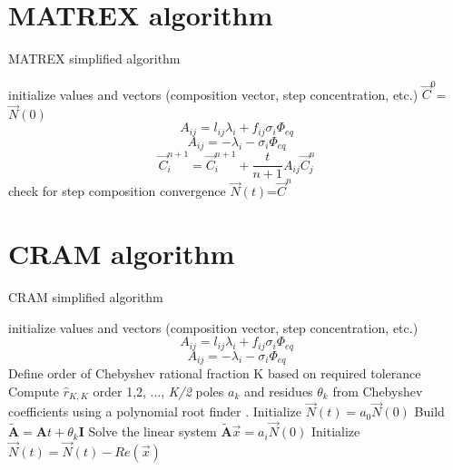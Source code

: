 \documentclass[a4paper,titlepage]{article}
\newcommand{\xvec}{\ensuremath{\vec{x}}}
\newcommand{\nvec}{\ensuremath{\vec{N}}}
\newcommand{\cvec}{\ensuremath{\vec{C}}}
\begin{document}
\newpage
\begin{appendices}
\section{MATREX algorithm}
\label{App:Matrex}
\begin{algorithm}
\caption{MATREX simplified algorithm}
\begin{algorithmic}
\STATE initialize values and vectors (composition vector, step concentration, etc.)
\STATE $\cvec^0$=$\nvec(0)$
\STATE\[A_{ij}=l_{ij}\lambda_i+f_{ij}\sigma_i\Phi_{eq}\]
\ELSE 
\STATE \[A_{ij}=-\lambda_i -\sigma_i\Phi_{eq}\]
\ENDIF
\ENDFOR
\ENDFOR
{}
\STATE\[\cvec^{n+1}_i=\cvec^{n+1}_i+\frac{t}{n+1}A_{ij}\cvec_j^n\]
\ENDFOR
\ENDFOR
\STATE check for step composition convergence
\ENDWHILE 
\STATE $\nvec(t)$=$\cvec^n$
\ENDFOR

\end{algorithmic}
\end{algorithm}
\newpage
\section{CRAM algorithm}
\label{App:Cram}
\begin{algorithm}
\caption{CRAM simplified algorithm}
\begin{algorithmic}
\STATE initialize values and vectors (composition vector, step concentration, etc.)
\STATE\[A_{ij}=l_{ij}\lambda_i+f_{ij}\sigma_i\Phi_{eq}\]
\ELSE 
\STATE \[A_{ij}=-\lambda_i -\sigma_i\Phi_{eq}\]
\ENDIF
\ENDFOR
\ENDFOR
\STATE Define order of Chebyshev rational fraction K based on required tolerance \cite{trefethen2006talbot}
\STATE Compute $\hat{r}_{K,K}$ order 1,2, ..., \textit{K/2} poles $a_k$ and residues $\theta_k$ from Chebyshev coefficients using a polynomial root finder \cite{trefethen2006talbot}.
\STATE Initialize $\nvec(t)=a_0\nvec(0)$
\STATE Build $\tilde{\textbf{A}}=\textbf{A}t+\theta_k \textbf{I}$
\STATE Solve the linear system $\tilde{\textbf{A}}\xvec=a_i \nvec(0)$ \footnotemark
\STATE Initialize $\nvec(t)=\nvec(t)-Re(\xvec)$
\ENDWHILE
\ENDFOR
\end{algorithmic}
\end{algorithm}
\end{appendices}

\newpage
\printbibliography
\end{document}
